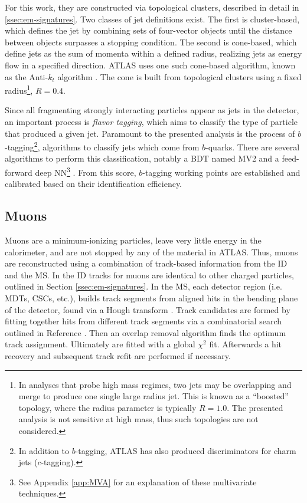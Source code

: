 For this work, they are constructed via topological clusters, described in detail in \ref{ssec:em-signatures}. Two classes of jet definitions exist. The first is cluster-based, which defines the jet by combining sets of four-vector objects until the distance between objects surpasses a stopping condition. The second is cone-based, which define jets as the sum of momenta within a defined radius, realizing jets as energy flow in a specified direction. ATLAS uses one such cone-based algorithm, known as the Anti-$k_t$ algorithm \cite{anti-kt}. The cone is built from topological clusters using a fixed radius\footnote{In analyses that probe high mass regimes, two jets may be overlapping and merge to produce one single large radius jet. This is known as a ``boosted'' topology, where the radius parameter is typically $R=1.0$. The presented analysis is not sensitive at high mass, thus such topologies are not considered.}, $R=0.4$.


Since all fragmenting strongly interacting particles appear as jets in the detector, an important process is \textit{flavor tagging}, which aims to classify the type of particle that produced a given jet. Paramount to the presented analysis is the process of $b$-tagging\footnote{In addition to $b$-tagging, ATLAS has also produced discriminators for charm jets ($c$-tagging).}, algorithms to classify jets which come from $b$-quarks. There are several algorithms to perform this classification, notably a \gls{BDT} named MV2 \cite{mv2-dl1} and a feed-forward deep \gls{NN}\footnote{See Appendix \ref{app:MVA} for an explanation of these multivariate techniques.} \cite{mv2-dl1}. From this score, $b$-tagging working points are established and calibrated based on their identification efficiency. 


\subsection{Muons} \label{ssec:muon-reco}

Muons are a minimum-ionizing particles, leave very little energy in the calorimeter, and are not stopped by any of the material in ATLAS. Thus, muons are reconstructed using a combination of track-based information from the \gls{ID} and the \gls{MS}. In the \gls{ID} tracks for muons are identical to other charged particles, outlined in Section \ref{ssec:em-signatures}. In the \gls{MS}, each detector region (i.e. \glspl{MDT}, \glspl{CSC}, etc.), builds track segments from aligned hits in the bending plane of the detector, found via a Hough transform \cite{hough-transf}. Track candidates are formed by fitting together hits from different track segments via a combinatorial search outlined in Reference \cite{muon-reco}. Then an overlap removal algorithm finds the optimum track assignment. Ultimately  are fitted with a global $\chi^2$ fit. Afterwards a hit recovery and subsequent track refit are performed if necessary.

